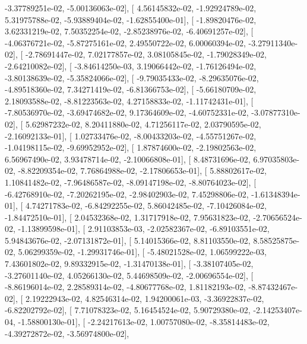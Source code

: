 \documentclass{article}
\begin{document}
         -3.37789251e-02,  -5.00136063e-02],
       [  4.56145832e-02,  -1.92924789e-02,   5.31975788e-02,
         -5.93889404e-02,  -1.62855400e-01],
       [ -1.89820476e-02,   3.62331219e-02,   7.50352254e-02,
         -2.85238976e-02,  -6.40691257e-02],
       [ -4.06376721e-02,  -5.87275161e-02,   2.49550722e-02,
          6.00060394e-02,  -3.27911340e-02],
       [ -2.78691447e-02,   7.02177857e-02,   3.08105845e-02,
         -1.79028349e-02,  -2.64210082e-02],
       [ -3.84614250e-03,   3.19066442e-02,  -1.76126494e-02,
         -3.80138639e-02,  -5.35824066e-02],
       [ -9.79035433e-02,  -8.29635076e-02,  -4.89518360e-02,
          7.34271419e-02,  -6.81366753e-02],
       [ -5.66180709e-02,   2.18093588e-02,  -8.81223563e-02,
          4.27158833e-02,  -1.11742431e-01],
       [ -7.80536970e-02,  -3.69474682e-02,   9.17364609e-02,
         -4.60752331e-02,  -3.07877310e-02],
       [  5.62987232e-02,   8.20411880e-02,   4.71256117e-02,
          2.03790595e-02,  -2.16092133e-01],
       [  1.02733476e-02,  -8.00433203e-02,  -4.55751267e-02,
         -1.04198115e-02,  -9.69952952e-02],
       [  1.87874600e-02,  -2.19802563e-02,   6.56967490e-02,
          3.93478714e-02,  -2.10066808e-01],
       [  8.48731696e-02,   6.97035803e-02,  -8.82209354e-02,
          7.76864988e-02,  -2.17806653e-01],
       [  5.88802617e-02,   1.10841482e-02,  -7.96486587e-02,
         -8.09147198e-02,  -8.80764023e-02],
       [ -6.42768910e-02,  -7.20262195e-02,  -2.98402903e-02,
          7.45298806e-02,  -1.61348394e-01],
       [  4.74271783e-02,  -6.84292255e-02,   5.86042485e-02,
         -7.10426084e-02,  -1.84472510e-01],
       [  2.04532368e-02,   1.31717918e-02,   7.95631823e-02,
         -2.70656524e-02,  -1.13899598e-01],
       [  2.91103853e-03,  -2.02582367e-02,  -6.89103551e-02,
          5.94843676e-02,  -2.07131872e-01],
       [  5.14015366e-02,   8.81103550e-02,   8.58525875e-02,
          5.06299359e-02,  -1.29931746e-01],
       [ -5.48021528e-02,   1.06599222e-03,   7.43601802e-02,
          9.89332915e-02,  -1.31470138e-01],
       [ -3.38107405e-02,  -3.27601140e-02,   4.05266130e-02,
          5.44698509e-02,  -2.00696554e-02],
       [ -8.86196014e-02,   2.28589314e-02,  -4.80677768e-02,
          1.81182193e-02,  -8.87432467e-02],
       [  2.19222943e-02,   4.82546314e-02,   1.94200061e-03,
         -3.36922837e-02,  -6.82202792e-02],
       [  7.71078323e-02,   5.16454524e-02,   5.90729380e-02,
         -2.14253407e-04,  -1.58800130e-01],
       [ -2.24217613e-02,   1.00757080e-02,  -8.35814483e-02,
         -4.39272872e-02,  -3.56974800e-02],
\end{document}
